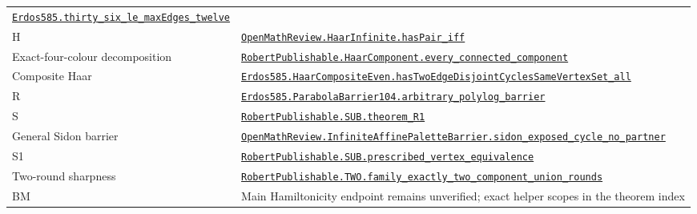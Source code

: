 \documentclass[
  11pt,
]{article}
\begin{document}
{\begin{longtable}[]{@{}
  >{\raggedright\arraybackslash}p{}
  >{\raggedright\arraybackslash}p{}@{}}
\href{https://github.com/alejandrozu/openmath-2026-judging/blob/70c5ec3107658182f22c207d4c50f53f9cb3e602/robert-review-2026-10-07/lean/Openmath/Proofs/Final.lean\#L116}{\texttt{Erdos585.thirty\_six\_le\_maxEdges\_twelve}} \\
H &
\href{https://github.com/alejandrozu/openmath-2026-judging/blob/70c5ec3107658182f22c207d4c50f53f9cb3e602/robert-review-2026-10-07/lean/HaarInfinite.lean\#L110}{\texttt{OpenMathReview.HaarInfinite.hasPair\_iff}} \\
Exact-four-colour decomposition &
\href{https://github.com/alejandrozu/openmath-2026-judging/blob/70c5ec3107658182f22c207d4c50f53f9cb3e602/robert-review-2026-10-07/lean/HaarComponents.lean\#L73}{\texttt{RobertPublishable.HaarComponent.every\_connected\_component}} \\
Composite Haar &
\href{https://github.com/alejandrozu/openmath-2026-judging/blob/70c5ec3107658182f22c207d4c50f53f9cb3e602/robert-review-2026-10-07/lean/Openmath/Proofs/HaarCompositeEven.lean\#L441}{\texttt{Erdos585.HaarCompositeEven.hasTwoEdgeDisjointCyclesSameVertexSet\_all}} \\
R &
\href{https://github.com/alejandrozu/openmath-2026-judging/blob/70c5ec3107658182f22c207d4c50f53f9cb3e602/robert-review-2026-10-07/lean/Openmath/Proofs/ParabolaBarrier104.lean\#L145}{\texttt{Erdos585.ParabolaBarrier104.arbitrary\_polylog\_barrier}} \\
S &
\href{https://github.com/alejandrozu/openmath-2026-judging/blob/70c5ec3107658182f22c207d4c50f53f9cb3e602/robert-review-2026-10-07/lean/R1.lean\#L13}{\texttt{RobertPublishable.SUB.theorem\_R1}} \\
General Sidon barrier &
\href{https://github.com/alejandrozu/openmath-2026-judging/blob/70c5ec3107658182f22c207d4c50f53f9cb3e602/robert-review-2026-10-07/lean/InfiniteAffinePaletteBarrier.lean\#L54}{\texttt{OpenMathReview.InfiniteAffinePaletteBarrier.sidon\_exposed\_cycle\_no\_partner}} \\
S1 &
\href{https://github.com/alejandrozu/openmath-2026-judging/blob/70c5ec3107658182f22c207d4c50f53f9cb3e602/robert-review-2026-10-07/lean/PrescribedVertex.lean\#L89}{\texttt{RobertPublishable.SUB.prescribed\_vertex\_equivalence}} \\
Two-round sharpness &
\href{https://github.com/alejandrozu/openmath-2026-judging/blob/70c5ec3107658182f22c207d4c50f53f9cb3e602/robert-review-2026-10-07/lean/CycleComposition.lean\#L171}{\texttt{RobertPublishable.TWO.family\_exactly\_two\_component\_union\_rounds}} \\
BM & Main Hamiltonicity endpoint remains unverified; exact helper scopes
in the theorem index \\
\end{longtable}
}
\end{document}
